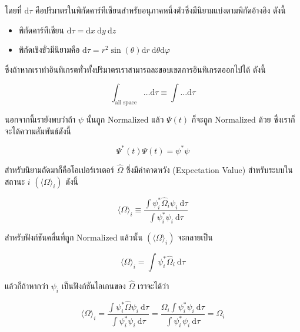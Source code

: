 \noindent โดยที่ $\mathrm{d} \tau$ คือปริมาตรในพิกัดคาร์ทีเซียนสำหรับอนุภาคหนึ่งตัวซึ่งมีนิยามแบ่งตามพิกัดอ้างอิง ดังนี้

\begin{itemize}[topsep=0pt,noitemsep]
    \setlength\itemsep{1em}
    \item พิกัดคาร์ทีเซียน $\mathrm{d} \tau = \mathrm{d} x \mathrm{~d} y \mathrm{~d} z$

    \item พิกัดเชิงขั่วมีนิยามคือ $\mathrm{d} \tau = r^2 \sin (\theta) \mathrm{d} r \mathrm{~d} \theta \mathrm{d} \varphi$
\end{itemize}

\noindent ซึ่งถ้าหากเราทำอินทิเกรตทั่วทั้งปริมาตรเราสามารถละขอบเขตการอินทิเกรตออกไปได้ ดังนี้

\begin{equation}
    \int_{\text{all space}} \ldots \mathrm{d} \tau \equiv \int \ldots \mathrm{d} \tau
\end{equation}

นอกจากนี้เรายังพบว่าถ้า $\psi$ นั้นถูก Normalized แล้ว $\Psi(t)$ ก็จะถูก Normalized ด้วย ซึ่งเราก็จะได้ความสัมพันธ์ดังนี้

\begin{equation}
    \Psi^*(t) \Psi(t) = \psi^* \psi
\end{equation}

สำหรับนิยามถัดมาก็คือโอเปอร์เรเตอร์ $\hat{\Omega}$ ซึ่งมีค่าคาดหวัง (Expectation Value) สำหรับระบบในสถานะ $i$
$(\langle\Omega\rangle_i)$ ดังนี้

\begin{equation}
    \langle\Omega\rangle_i
    \equiv
    \frac
    {
        \int \psi_i^* \hat{\Omega}_i \psi_i \mathrm{~d} \tau
    }
    {
        \int \psi_i^* \psi_i \mathrm{~d} \tau
    }
\end{equation}

\noindent สำหรับฟังก์ชันคลื่นที่ถูก Normalized แล้วนั้น $(\langle\Omega\rangle_i)$ จะกลายเป็น

\begin{equation}
    \langle\Omega\rangle_i = \int \psi_i^* \hat{\Omega}_i \mathrm{~d} \tau
\end{equation}

แล้วก็ถ้าหากว่า $\psi_i$ เป็นฟังก์ชันไอเกนของ $\hat{\Omega}$ เราจะได้ว่า

\begin{equation}
    \langle\Omega\rangle_i
    = \frac
    {
        \int \psi_i^* \hat{\Omega} \psi_i \mathrm{~d} \tau
    }
    {
        \int \psi_i^* \psi_i \mathrm{~d} \tau
    }
    = \frac
    {
        \Omega_i \int \psi_i^* \psi_i \mathrm{~d} \tau
    }
    {
        \int \psi_i^* \psi_i \mathrm{~d} \tau
    }
    = \Omega_i
\end{equation}

